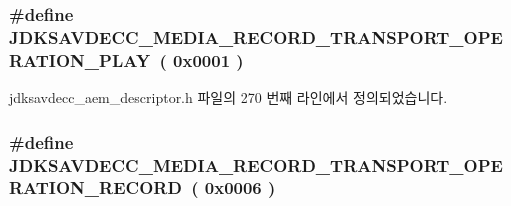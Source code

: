 \subsubsection[{\texorpdfstring{J\+D\+K\+S\+A\+V\+D\+E\+C\+C\+\_\+\+M\+E\+D\+I\+A\+\_\+\+R\+E\+C\+O\+R\+D\+\_\+\+T\+R\+A\+N\+S\+P\+O\+R\+T\+\_\+\+O\+P\+E\+R\+A\+T\+I\+O\+N\+\_\+\+P\+L\+AY}{JDKSAVDECC_MEDIA_RECORD_TRANSPORT_OPERATION_PLAY}}]{\setlength{\rightskip}{0pt plus 5cm}\#define J\+D\+K\+S\+A\+V\+D\+E\+C\+C\+\_\+\+M\+E\+D\+I\+A\+\_\+\+R\+E\+C\+O\+R\+D\+\_\+\+T\+R\+A\+N\+S\+P\+O\+R\+T\+\_\+\+O\+P\+E\+R\+A\+T\+I\+O\+N\+\_\+\+P\+L\+AY~( 0x0001 )}\hypertarget{group__media__record__transport__operation_ga28f803d66f4e81eb4666a5a24b9708a4}{}\label{group__media__record__transport__operation_ga28f803d66f4e81eb4666a5a24b9708a4}


jdksavdecc\+\_\+aem\+\_\+descriptor.\+h 파일의 270 번째 라인에서 정의되었습니다.

\subsubsection[{\texorpdfstring{J\+D\+K\+S\+A\+V\+D\+E\+C\+C\+\_\+\+M\+E\+D\+I\+A\+\_\+\+R\+E\+C\+O\+R\+D\+\_\+\+T\+R\+A\+N\+S\+P\+O\+R\+T\+\_\+\+O\+P\+E\+R\+A\+T\+I\+O\+N\+\_\+\+R\+E\+C\+O\+RD}{JDKSAVDECC_MEDIA_RECORD_TRANSPORT_OPERATION_RECORD}}]{\setlength{\rightskip}{0pt plus 5cm}\#define J\+D\+K\+S\+A\+V\+D\+E\+C\+C\+\_\+\+M\+E\+D\+I\+A\+\_\+\+R\+E\+C\+O\+R\+D\+\_\+\+T\+R\+A\+N\+S\+P\+O\+R\+T\+\_\+\+O\+P\+E\+R\+A\+T\+I\+O\+N\+\_\+\+R\+E\+C\+O\+RD~( 0x0006 )}\hypertarget{group__media__record__transport__operation_gaf19cfe0a934ebb99416fce74242cde4e}{}\label{group__media__record__transport__operation_gaf19cfe0a934ebb99416fce74242cde4e}


